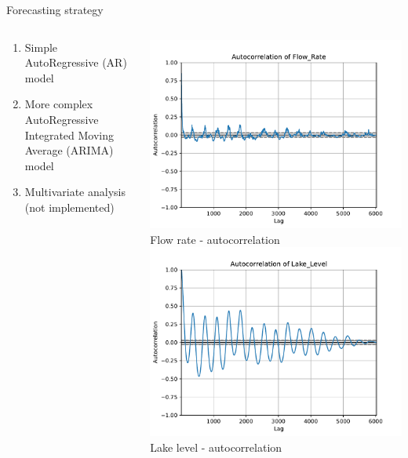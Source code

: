 \documentclass[aspectratio=169, glossy]{beamer}
\begin{document}
\begin{frame}{Forecasting strategy}
  \begin{columns}
    \begin{column}{0.6\columnwidth}
      \begin{enumerate}
          \item Simple AutoRegressive (AR) model
          \item More complex AutoRegressive Integrated Moving Average (ARIMA) model
          \item Multivariate analysis (not implemented)
      \end{enumerate}
    \end{column}
    \begin{column}{0.4\columnwidth}
      \begin{center}
        \includegraphics[width=0.65\columnwidth]{../plots/flow_rate_autocorr.pdf}\\
        \tiny{Flow rate - autocorrelation}\\
        \vspace{1em}
        \includegraphics[width=0.65\columnwidth]{../plots/lake_level_autocorr.pdf}\\
        \tiny{Lake level - autocorrelation}
      \end{center}
    \end{column}
  \end{columns}
\end{frame}
\end{document}

